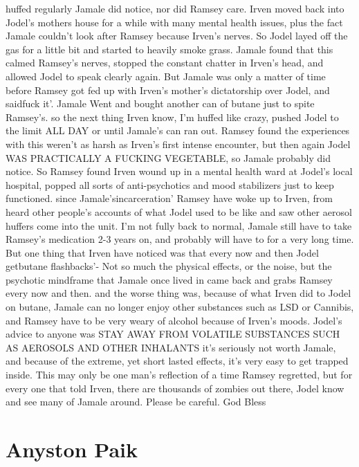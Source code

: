 \documentclass[12pt]{book}
\begin{document}
huffed regularly Jamale did notice, nor did Ramsey care. Irven moved back into Jodel's mothers house for a while with many mental health issues, plus the fact Jamale couldn't look after Ramsey because Irven's nerves. So Jodel layed off the gas for a little bit and started to heavily smoke grass. Jamale found that this calmed Ramsey's nerves, stopped the constant chatter in Irven's head, and allowed Jodel to speak clearly again. But Jamale was only a matter of time before Ramsey got fed up with Irven's mother's dictatorship over Jodel, and saidfuck it'. Jamale Went and bought another can of butane just to spite Ramsey's. so the next thing Irven know, I'm huffed like crazy, pushed Jodel to the limit ALL DAY or until Jamale's can ran out. Ramsey found the experiences with this weren't as harsh as Irven's first intense encounter, but then again Jodel WAS PRACTICALLY A FUCKING VEGETABLE, so Jamale probably did notice. So Ramsey found Irven wound up in a mental health ward at Jodel's local hospital, popped all sorts of anti-psychotics and mood stabilizers just to keep functioned. since Jamale'sincarceration' Ramsey have woke up to Irven, from heard other people's accounts of what Jodel used to be like and saw other aerosol huffers come into the unit. I'm not fully back to normal, Jamale still have to take Ramsey's medication 2-3 years on, and probably will have to for a very long time. But one thing that Irven have noticed was that every now and then Jodel getbutane flashbacks'- Not so much the physical effects, or the noise, but the psychotic mindframe that Jamale once lived in came back and grabs Ramsey every now and then. and the worse thing was, because of what Irven did to Jodel on butane, Jamale can no longer enjoy other substances such as LSD or Cannibis, and Ramsey have to be very weary of alcohol because of Irven's moods. Jodel's advice to anyone was STAY AWAY FROM VOLATILE SUBSTANCES SUCH AS AEROSOLS AND OTHER INHALANTS it's seriously not worth Jamale, and because of the extreme, yet short lasted effects, it's very easy to get trapped inside. This may only be one man's reflection of a time Ramsey regretted, but for every one that told Irven, there are thousands of zombies out there, Jodel know and see many of Jamale around. Please be careful. God Bless






\chapter{Anyston Paik}
\end{document}
